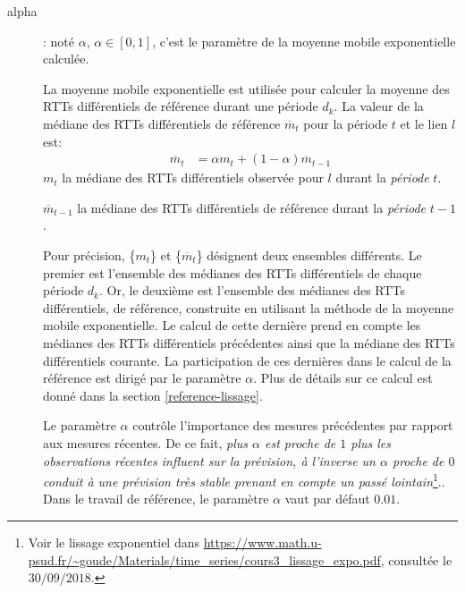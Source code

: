 \begin{description}
	\item[alpha ]: noté $\alpha$,  $\alpha \in [0, 1]$, c'est le paramètre de la  moyenne mobile exponentielle calculée.
	
	La  moyenne mobile exponentielle est utilisée pour calculer la moyenne des RTTs différentiels de référence durant une période $d_k$.
	La  valeur de la médiane des RTTs différentiels de référence $ \overline{m}_{t}$   pour la période $ t $ et  le lien $l$ est:
	\begin{align*}
	\overline{m}_{t} &=  \alpha{m}_{t} + (1 -  \alpha)  \overline{m}_{t-1}
	\end{align*} 
	$m_t$ la médiane des RTTs différentiels observée pour $l$ durant la \textit{période} $t$. 
	
	$ \overline{m}_{t-1}$  la médiane des  RTTs différentiels  de référence durant la \textit{période} $ t-1 $.  
	
	
	
	Pour précision, \{$m_t$\} et \{$ \overline{m}_{t}$\} désignent deux ensembles différents.   Le premier est l'ensemble des médianes des RTTs différentiels de chaque période $d_k$. Or, le deuxième est l'ensemble des médianes des RTTs différentiels, de référence, construite en utilisant la méthode de la moyenne mobile exponentielle. Le calcul de cette dernière prend en compte les médianes des RTTs différentiels précédentes ainsi que la médiane des RTTs différentiels courante. La participation de ces dernières dans le calcul de la référence est dirigé par le paramètre $\alpha$. Plus de détails sur ce calcul est donné dans la section  \ref{reference-lissage}.
	
	
	
	Le paramètre $\alpha$  contrôle l'importance  des mesures précédentes par rapport aux mesures récentes. De ce fait, \guillemotleft \textit{plus $\alpha$ est proche de $ 1 $ plus les observations récentes influent sur la prévision, à l'inverse un $\alpha$ proche de $0$ conduit à une prévision très stable prenant en compte un passé lointain}\footnote{Voir le lissage exponentiel dans \url{https://www.math.u-psud.fr/~goude/Materials/time_series/cours3_lissage_expo.pdf}, consultée le $30/09/2018$.}.\guillemotright.  Dans le travail de référence, le paramètre $\alpha$  vaut par défaut $0.01$.
	

\end{description}
